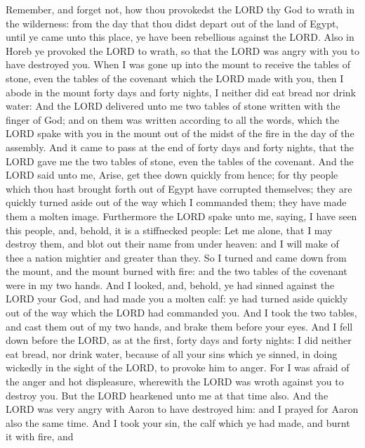  Remember, and forget not, how thou provokedst the LORD
thy God to wrath in the wilderness: from the day that thou didst depart
out of the land of Egypt, until ye came unto this place, ye have been
rebellious against the LORD.  Also in Horeb ye provoked
the LORD to wrath, so that the LORD was angry with you to have destroyed
you.  When I was gone up into the mount to receive the
tables of stone, even the tables of the covenant which the LORD made
with you, then I abode in the mount forty days and forty nights, I
neither did eat bread nor drink water:  And the LORD
delivered unto me two tables of stone written with the finger of God;
and on them was written according to all the words, which the LORD spake
with you in the mount out of the midst of the fire in the day of the
assembly.  And it came to pass at the end of forty days
and forty nights, that the LORD gave me the two tables of stone, even
the tables of the covenant.  And the LORD said unto me,
Arise, get thee down quickly from hence; for thy people which thou hast
brought forth out of Egypt have corrupted themselves; they are quickly
turned aside out of the way which I commanded them; they have made them
a molten image.  Furthermore the LORD spake unto me,
saying, I have seen this people, and, behold, it is a stiffnecked
people:  Let me alone, that I may destroy them, and blot
out their name from under heaven: and I will make of thee a nation
mightier and greater than they.  So I turned and came
down from the mount, and the mount burned with fire: and the two tables
of the covenant were in my two hands.  And I looked, and,
behold, ye had sinned against the LORD your God, and had made you a
molten calf: ye had turned aside quickly out of the way which the LORD
had commanded you.  And I took the two tables, and cast
them out of my two hands, and brake them before your eyes.
 And I fell down before the LORD, as at the first, forty
days and forty nights: I did neither eat bread, nor drink water, because
of all your sins which ye sinned, in doing wickedly in the sight of the
LORD, to provoke him to anger.  For I was afraid of the
anger and hot displeasure, wherewith the LORD was wroth against you to
destroy you. But the LORD hearkened unto me at that time also.
 And the LORD was very angry with Aaron to have destroyed
him: and I prayed for Aaron also the same time.  And I
took your sin, the calf which ye had made, and burnt it with fire, and
